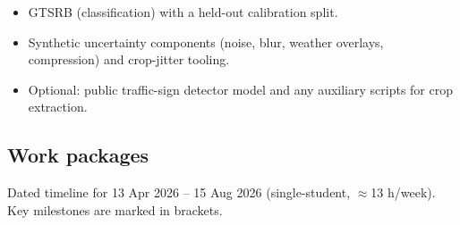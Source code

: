 \documentclass[11pt,a4paper]{article}
\begin{document}
\begin{itemize}
  \item GTSRB (classification) with a held-out calibration split.
  \item Synthetic uncertainty components (noise, blur, weather overlays, compression) and crop-jitter tooling.
  \item Optional: public traffic-sign detector model and any auxiliary scripts for crop extraction.
\end{itemize}

\subsection{Work packages}

Dated timeline for 13 Apr 2026 -- 15 Aug 2026 (single-student, \(\approx\)13 h/week). Key milestones are marked in brackets.
\end{document}
